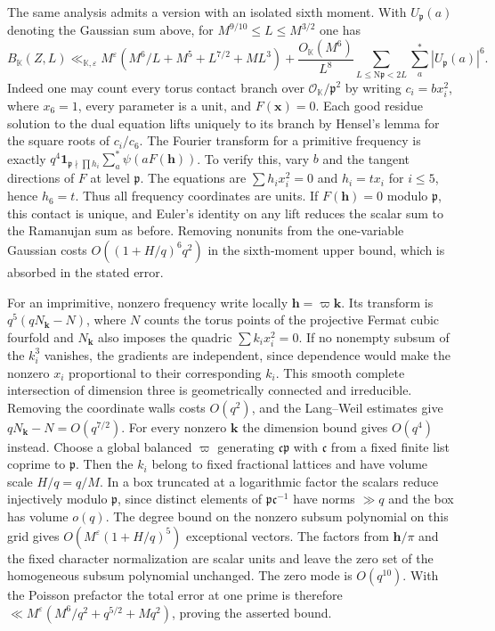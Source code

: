\documentclass[11pt,letterpaper]{article}
\theoremstyle{definition}
\numberwithin{equation}{section}
\begin{document}
The same analysis admits a version with an isolated sixth moment. With
$U_{\mathfrak p}(a)$ denoting the Gaussian sum above, for
$M^{9/10}\le L\le M^{3/2}$ one has
\[
 B_{\mathbb K}(Z,L)
 \ll_{\mathbb K,\varepsilon}M^\varepsilon
       (M^6/L+M^5+L^{7/2}+ML^3)
       +\frac{O_{\mathbb K}(M^6)}{L^8}
         \sum_{L\le\mathrm N\mathfrak p<2L}\sum_a^*|U_{\mathfrak p}(a)|^6 .
\]
Indeed one may count every torus contact branch over
$\mathcal O_{\mathbb K}/\mathfrak p^2$ by writing
$c_i=b x_i^2$, where $x_6=1$, every parameter is a unit, and
$F(\mathbf x)=0$. Each good residue solution to the dual equation lifts
uniquely to its branch by Hensel's lemma for the square roots of
$c_i/c_6$. The Fourier transform for a primitive frequency is exactly
$q^4\mathbf1_{\mathfrak p\nmid\prod h_i}
\sum_a^*\psi(aF(\mathbf h))$. To verify this, vary $b$ and the tangent
directions of $F$ at level $\mathfrak p$. The equations are
$\sum h_i x_i^2=0$ and $h_i=t x_i$ for $i\le5$, hence $h_6=t$.
Thus all frequency coordinates are units. If $F(\mathbf h)=0$ modulo
$\mathfrak p$, this contact is unique, and Euler's identity on any lift
reduces the scalar sum to the Ramanujan sum as before. Removing
nonunits from the one-variable Gaussian costs $O((1+H/q)^6q^2)$ in the
sixth-moment upper bound, which is absorbed in the stated error.

For an imprimitive, nonzero frequency write locally $\mathbf h=\varpi
\mathbf k$. Its transform is $q^5(qN_{\mathbf k}-N)$, where $N$ counts
the torus points of the projective Fermat cubic fourfold and $N_{\mathbf k}$
also imposes the quadric $\sum k_i x_i^2=0$. If no nonempty subsum
of the $k_i^3$ vanishes, the gradients are independent, since dependence
would make the nonzero $x_i$ proportional to their corresponding $k_i$.
This smooth complete intersection of dimension three is geometrically
connected and irreducible. Removing the coordinate walls costs $O(q^2)$,
and the Lang--Weil estimates give $qN_{\mathbf k}-N=O(q^{7/2})$.
For every nonzero $\mathbf k$ the dimension bound gives $O(q^4)$ instead.
Choose a global balanced $\varpi$ generating $\mathfrak c\mathfrak p$
with $\mathfrak c$ from a fixed finite list coprime to $\mathfrak p$.
Then the $k_i$ belong to fixed fractional lattices and have volume
scale $H/q=q/M$. In a box truncated at a logarithmic factor the scalars
reduce injectively modulo $\mathfrak p$, since distinct elements of
$\mathfrak p\mathfrak c^{-1}$ have norms $\gg q$ and the box has volume
$o(q)$. The degree bound on the nonzero subsum polynomial on this
grid gives $O(M^\varepsilon(1+H/q)^5)$ exceptional vectors. The factors
from $\mathbf h/\pi$ and the fixed character normalization are scalar
units and leave the zero set of the homogeneous subsum polynomial
unchanged. The zero mode is $O(q^{10})$. With the Poisson prefactor
the total error at one prime is therefore
$\ll M^\varepsilon(M^6/q^2+q^{5/2}+Mq^2)$, proving the asserted bound.
\end{document}
